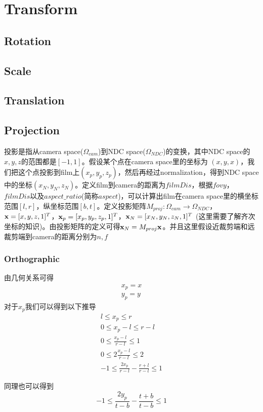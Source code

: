\section{Transform}
\subsection{Rotation}
\subsection{Scale}
\subsection{Translation}
\subsection{Projection}
投影是指从camera space($\Omega_{cam}$)到NDC space($\Omega_{NDC}$)的变换，其中NDC space的$x,y,z$的范围都是$[-1,1]$。假设某个点在camera space里的坐标为 $(x,y,x)$，我们把这个点投影到film上$(x_p,y_p,z_p)$，然后再经过normalization，得到NDC space中的坐标$(x_N, y_N,z_N)$。定义film到camera的距离为$filmDis$，根据$fovy$，$filmDis$以及$aspect\_ratio$(简称$aspect$)，可以计算出film在camera space里的横坐标范围$[l,r]$，纵坐标范围$[b,t]$。定义投影矩阵$M_{proj}: \Omega_{cam}\to \Omega_{NDC}$，$\bold{x} = [x, y, z, 1]^T$，$\bold{x}_p = [x_p, y_p, z_p, 1]^T$，$\bold{x}_N = [x_N, y_N, z_N, 1]^T$ (这里需要了解齐次坐标的知识)。由投影矩阵的定义可得$\bold{x}_N = M_{proj}\bold{x}$。并且这里假设近裁剪端和远裁剪端到camera的距离分别为$n,f$
\subsubsection{Orthographic}
由几何关系可得
\begin{gather*}
x_p = x\\
y_p = y
\end{gather*}
对于$x_p$我们可以得到以下推导
\begin{gather*}
l \leq x_p \leq r\\
0 \leq x_p - l \leq r-l\\
0 \leq \frac{x_p - l}{r - l} \leq 1\\
0 \leq 2\frac{x_p - l}{r - l} \leq 2\\
-1 \leq \frac{2 x_p}{r-l} - \frac{r + l}{r - l} \leq 1
\end{gather*}

同理也可以得到
\begin{displaymath}
-1 \leq \frac{2y_p}{t - b} - \frac{t + b}{t - b} \leq 1
\end{displaymath}
\\

